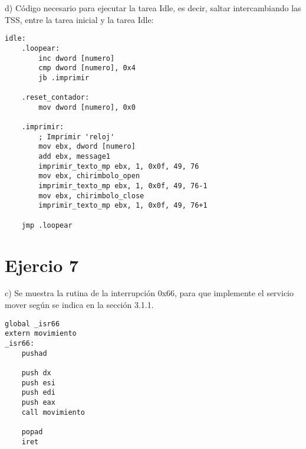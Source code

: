 \documentclass[a4paper]{article}
\begin{document}

{\large d)} C\'odigo necesario para ejecutar la tarea Idle, es decir, saltar intercambiando las
TSS, entre la tarea inicial y la tarea Idle:

\begin{codesnippet}
\begin{verbatim}
idle:
    .loopear:
        inc dword [numero]
        cmp dword [numero], 0x4
        jb .imprimir

    .reset_contador:
        mov dword [numero], 0x0

    .imprimir:
        ; Imprimir 'reloj'
        mov ebx, dword [numero]
        add ebx, message1
        imprimir_texto_mp ebx, 1, 0x0f, 49, 76
        mov ebx, chirimbolo_open
        imprimir_texto_mp ebx, 1, 0x0f, 49, 76-1
        mov ebx, chirimbolo_close
        imprimir_texto_mp ebx, 1, 0x0f, 49, 76+1

    jmp .loopear
\end{verbatim}
\end{codesnippet}

\newpage
\section{Ejercio 7}





{\large c)} Se muestra la rutina de la interrupci\'on 0x66, para que implemente el servicio mover seg\'un
se indica en la secci\'on 3.1.1.\\

\begin{codesnippet}
\begin{verbatim}
global _isr66
extern movimiento
_isr66:
    pushad
    
    push dx
    push esi
    push edi
    push eax
    call movimiento

    popad
    iret
\end{verbatim}
\end{codesnippet}
\end{document}
